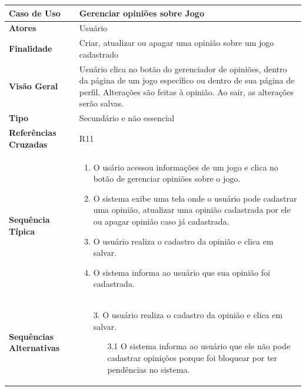 \documentclass[a4paper,11pt]{article}
\begin{document}
\begin{table}[H]
		\begin{tabularx}{\textwidth}{|l|X|}
		\hline
			\textbf{Caso de Uso} &  Gerenciar opiniões sobre Jogo \\ \hline
			\textbf{Atores} &  Usuário  \\ \hline
			\textbf{Finalidade} &  Criar, atualizar ou apagar uma opinião sobre um jogo cadastrado  \\ \hline
			\textbf{Visão Geral} & Usuário clica no botão do gerenciador de opiniões, dentro
da página de um jogo específico ou dentro de sua página de perfil. Alterações são
feitas à opinião. Ao sair, as alterações serão salvas.  \\ \hline
			\textbf{Tipo} &  Secundário e não essencial\\ \hline
			\textbf{Referências Cruzadas} &  R11 \\ \hline
			
			\textbf{Sequência Típica} & 
			\begin{enumerate}
				\item O usário acessou informações de um jogo e clica no botão de gerenciar opiniões sobre o jogo.
				\item O sistema exibe uma tela onde o usuário pode cadastrar uma opinião, atualizar uma opinião cadastrada por ele ou apagar opinião caso já cadastrada.
				\item O usuário realiza o cadastro da opinião e clica em salvar.
				\item O sistema informa ao usuário que sua opinião foi cadastrada.
			\end{enumerate} \\ \hline
			
			\textbf{Sequências Alternativas} & 
			\begin{itemize}
				\item [3.] O usuário realiza o cadastro da opinião e clica em salvar.
				\begin{itemize}
					\item [3.1] O sistema informa ao usuário que ele não pode cadastrar opinições porque foi bloquear por ter pendências no sistema.
				\end{itemize}
			\end{itemize} \\ \hline
			
		\end{tabularx}
\end{table}
\end{document}
